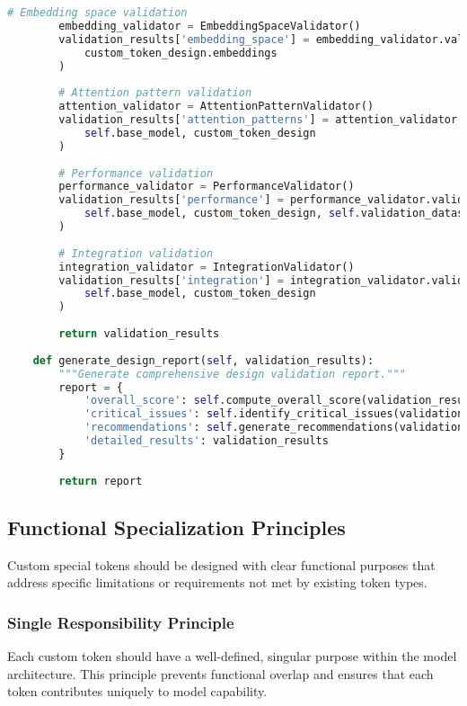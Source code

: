 \begin{lstlisting}[language=Python, caption=Attention pattern analysis for custom token design]
        # Embedding space validation
        embedding_validator = EmbeddingSpaceValidator()
        validation_results['embedding_space'] = embedding_validator.validate(
            custom_token_design.embeddings
        )
        
        # Attention pattern validation
        attention_validator = AttentionPatternValidator()
        validation_results['attention_patterns'] = attention_validator.validate(
            self.base_model, custom_token_design
        )
        
        # Performance validation
        performance_validator = PerformanceValidator()
        validation_results['performance'] = performance_validator.validate(
            self.base_model, custom_token_design, self.validation_dataset
        )
        
        # Integration validation
        integration_validator = IntegrationValidator()
        validation_results['integration'] = integration_validator.validate(
            self.base_model, custom_token_design
        )
        
        return validation_results
    
    def generate_design_report(self, validation_results):
        """Generate comprehensive design validation report."""
        report = {
            'overall_score': self.compute_overall_score(validation_results),
            'critical_issues': self.identify_critical_issues(validation_results),
            'recommendations': self.generate_recommendations(validation_results),
            'detailed_results': validation_results
        }
        
        return report
\end{lstlisting}

\subsection{Functional Specialization Principles}

Custom special tokens should be designed with clear functional purposes that address specific limitations or requirements not met by existing token types.

\subsubsection{Single Responsibility Principle}

Each custom token should have a well-defined, singular purpose within the model architecture. This principle prevents functional overlap and ensures that each token contributes uniquely to model capability.

